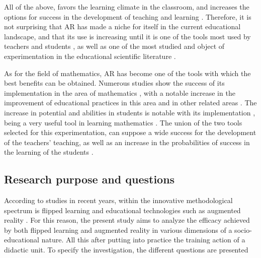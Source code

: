 \documentclass[english]{textolivre}
\begin{document}
All of the above, favors the learning climate in the classroom, and increases the options for success in the development of teaching and learning \cite{prendes2015}. Therefore, it is not surprising that AR has made a niche for itself in the current educational landscape, and that its use is increasing until it is one of the tools most used by teachers and students \cite{rodriguez2019}, as well as one of the most studied and object of experimentation in the educational scientific literature \cite{campos2019}. %

As for the field of mathematics, AR has become one of the tools with which the best benefits can be obtained. Numerous studies show the success of its implementation in the area of mathematics \cite{garzon2019}, with a notable increase in the improvement of educational practices in this area and in other related areas \cite{bower2014}. The increase in potential and abilities in students is notable with its implementation \cite{cai2019}, being a very useful tool in learning mathematics \cite{cahyono2020}. The union of the two tools selected for this experimentation, can suppose a wide success for the development of the teachers' teaching, as well as an increase in the probabilities of success in the learning of the students \cite{lopezbelmonte+pozosanchez+fuentescabrera+romero2020}.

\subsection{Research purpose and questions}
According to studies in recent years, within the innovative methodological spectrum is flipped learning \cite{morenoguerrero+romerorodriguez+lopezbelmonte+alonsogarcia2020, parragonzalez-lopezbelmonte-segurarobles2020} and educational technologies such as augmented reality \cite{cabero2019, lopezbelmonte+pozosanchez+fuentescabrera+parragonzalez2019}. %
For this reason, the present study aims to analyze the efficacy achieved by both flipped learning and augmented reality in various dimensions of a socio-educational nature. All this after putting into practice the training action of a didactic unit. To specify the investigation, the different questions are presented
\end{document}
